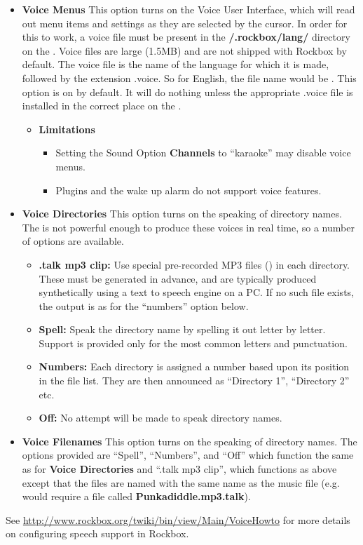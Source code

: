 \begin{itemize}
\item \textbf{Voice Menus}
  This option turns on the Voice User Interface, which will read out menu items and settings as they are selected by the cursor.  In order for this to work, a voice file must be present in the \textbf{/.rockbox/lang/} directory on the \dap.  Voice files are large (1.5MB) and are not shipped with Rockbox by default.
  The voice file is the name of the language for which it is made, followed by the extension .voice.  So for English, the file name would be .
  This option is on by default.  It will do nothing unless the appropriate .voice file is installed in the correct place on the \dap.
  \begin{itemize}
  \item \textbf{Limitations}
    \begin{itemize}
    \item Setting the Sound Option \textbf{Channels} to ``karaoke'' may disable voice menus.
    \item Plugins and the wake up alarm do not support voice features.
    \end{itemize}
  \end{itemize}

\item \textbf{Voice Directories}
  This option turns on the speaking of directory names.  The \dap is not powerful enough to produce these voices in real time, so a number of options are available.
  \begin{itemize}
  \item \textbf{.talk mp3 clip: }
    Use special pre{}-recorded MP3 files () in each directory.  These must be generated in advance, and are typically produced synthetically using a text to speech engine on a PC.  If no such file exists, the output is as for the ``numbers'' option below.
  \item \textbf{Spell: }
    Speak the directory name by spelling it out letter by letter.  Support is provided only for the most common letters and punctuation.
  \item \textbf{Numbers: }
    Each directory is assigned a number based upon its position in the file list.  They are then announced as ``Directory 1'', ``Directory 2'' etc.
  \item \textbf{Off: }
    No attempt will be made to speak directory names.
  \end{itemize}

\item \textbf{Voice Filenames}
  This option turns on the speaking of directory names.  The options provided are ``Spell'', ``Numbers'', and ``Off'' which function the same as for \textbf{Voice Directories} and ``.talk mp3 clip'', which functions as above except that the files are named with the same name as the music file (e.g.  would require a file called \textbf{Punkadiddle.mp3.talk}).
\end{itemize}
See \url{http://www.rockbox.org/twiki/bin/view/Main/VoiceHowto} for more details on configuring speech support in Rockbox.
